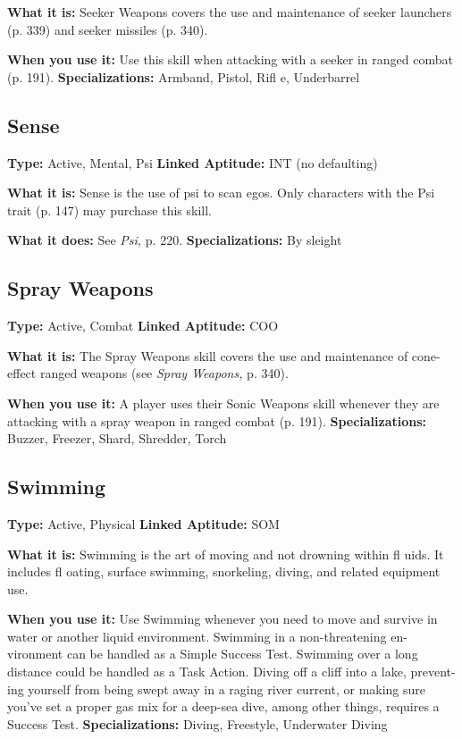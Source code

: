 \textbf{What it is:} Seeker Weapons covers the use and 
maintenance of seeker launchers (p. 339) and seeker 
missiles (p. 340).

\textbf{When you use it:} Use this skill when attacking with 
a seeker in ranged combat (p. 191).
\textbf{Specializations:} Armband, Pistol, Rifl e, Underbarrel

\subsection{Sense}

\textbf{Type:} Active, Mental, Psi
\textbf{Linked Aptitude:} INT (no defaulting)

\textbf{What it is:} Sense is the use of psi to scan egos. Only 
characters with the Psi trait (p. 147) may purchase 
this skill.

\textbf{What it does:} See \textit{Psi,} p. 220.
\textbf{Specializations:} By sleight

\subsection{Spray Weapons}

\textbf{Type:} Active, Combat
\textbf{Linked Aptitude:} COO

\textbf{What it is:} The Spray Weapons skill covers the use 
and maintenance of cone-effect ranged weapons (see 
\textit{Spray Weapons,} p. 340).

\textbf{When you use it:} A player uses their Sonic Weapons 
skill whenever they are attacking with a spray weapon 
in ranged combat (p. 191).
\textbf{Specializations:} Buzzer, Freezer, Shard, Shredder, Torch

\subsection{Swimming}

\textbf{Type:} Active, Physical
\textbf{Linked Aptitude:} SOM

\textbf{What it is:} Swimming is the art of moving and 
not drowning within fl uids. It includes fl oating, 
surface swimming, snorkeling, diving, and related 
equipment use.

\textbf{When you use it:} Use Swimming whenever you 
need to move and survive in water or another liquid 
environment. Swimming in a non-threatening en-
vironment can be handled as a Simple Success Test. 
Swimming over a long distance could be handled as 
a Task Action. Diving off a cliff into a lake, prevent-
ing yourself from being swept away in a raging river 
current, or making sure you've set a proper gas mix 
for a deep-sea dive, among other things, requires a 
Success Test.
\textbf{Specializations:} Diving, Freestyle, Underwater Diving

